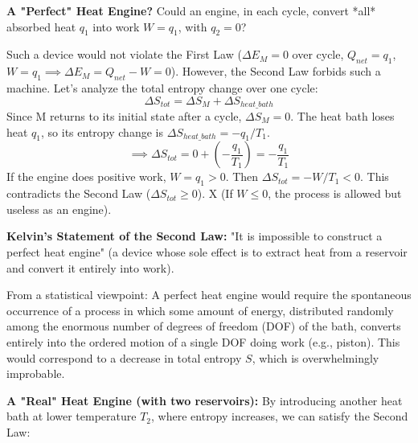 \documentclass[11pt]{article}
\begin{document}
\textbf{A "Perfect" Heat Engine?}
Could an engine, in each cycle, convert *all* absorbed heat $q_1$ into work $W=q_1$, with $q_2=0$?

\begin{center}
\end{center}

Such a device would not violate the First Law ($\Delta E_M = 0$ over cycle, $Q_{net} = q_1$, $W = q_1 \implies \Delta E_M = Q_{net} - W = 0$).
However, the Second Law forbids such a machine. Let's analyze the total entropy change over one cycle:
\[ \Delta S_{tot} = \Delta S_{M} + \Delta S_{heat\_bath} \]
Since M returns to its initial state after a cycle, $\Delta S_M = 0$.
The heat bath loses heat $q_1$, so its entropy change is $\Delta S_{heat\_bath} = -q_1 / T_1$.
\[ \implies \Delta S_{tot} = 0 + (-\frac{q_1}{T_1}) = -\frac{q_1}{T_1} \]
If the engine does positive work, $W=q_1>0$. Then $\Delta S_{tot} = -W/T_1 < 0$.
This contradicts the Second Law ($\Delta S_{tot} \ge 0$). X
(If $W \le 0$, the process is allowed but useless as an engine).

\textbf{Kelvin's Statement of the Second Law:} "It is impossible to construct a perfect heat engine" (a device whose sole effect is to extract heat from a reservoir and convert it entirely into work).

From a statistical viewpoint: A perfect heat engine would require the spontaneous occurrence of a process in which some amount of energy, distributed randomly among the enormous number of degrees of freedom (DOF) of the bath, converts entirely into the ordered motion of a single DOF doing work (e.g., piston). This would correspond to a decrease in total entropy $S$, which is overwhelmingly improbable.

\textbf{A "Real" Heat Engine (with two reservoirs):}
By introducing another heat bath at lower temperature $T_2$, where entropy increases, we can satisfy the Second Law:

\begin{center}
\end{center}
\end{document}
